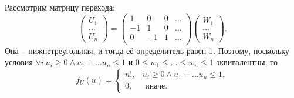 \begin{solution}
    Рассмотрим матрицу перехода:
    \[
        \begin{pmatrix*}
            U_1 \\ \ldots \\ U_n
        \end{pmatrix*} = \begin{pmatrix*} 1 & 0 & 0 & \ldots \\
                             -1 & 1 & 0 & \ldots \\
                             0 & -1 & 1 & \ldots \\
        \end{pmatrix*} \begin{pmatrix*}
                           W_1 \\ \ldots \\ W_n
        \end{pmatrix*}.
    \]
    Она -- нижнетреугольная, и тогда её определитель равен 1.
    Поэтому, поскольку условия $\forall i \  u_i \geq 0 \wedge u_1 + \ldots u_n \leq 1$ и $0 \leq w_1 \leq \ldots \leq w_n \leq 1$ эквивалентны, то
    \[
        f_U(u) = \begin{cases}
                  n!, & u_i \geq 0 \wedge u_1 + \ldots u_n \leq 1, \\
                     0, & \text{ иначе.}
        \end{cases}
    \]
\end{solution}